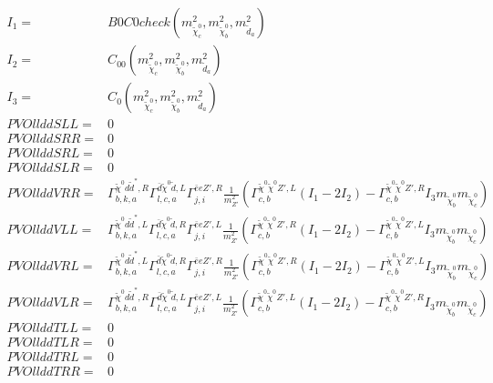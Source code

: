 \documentclass[A4,landscape]{article}
\begin{document}
\begin{align} 
I_1= & B0C0check(m^2_{\tilde{\chi}^0_{{c}}}, m^2_{\tilde{\chi}^0_{{b}}}, m^2_{\tilde{d}_{{a}}}) \\ 
I_2= & C_{00}(m^2_{\tilde{\chi}^0_{{c}}}, m^2_{\tilde{\chi}^0_{{b}}}, m^2_{\tilde{d}_{{a}}}) \\ 
I_3= & C_0(m^2_{\tilde{\chi}^0_{{c}}}, m^2_{\tilde{\chi}^0_{{b}}}, m^2_{\tilde{d}_{{a}}}) \\ 
  PVOllddSLL= & 0 \\ 
  PVOllddSRR= & 0 \\ 
  PVOllddSRL= & 0 \\ 
  PVOllddSLR= & 0 \\ 
  PVOllddVRR= &  \Gamma^{\tilde{\chi}^0 d \tilde{d}^*,R}_{b, k, a} \Gamma^{\bar{d}\tilde{\chi}^0 \tilde{d} ,L}_{l, c, a} \Gamma^{\bar{e}e {Z'} ,R}_{j, i} \frac{1}{m^2_{{Z'}}} (\Gamma^{\tilde{\chi}^0 \tilde{\chi}^0 {Z'} ,L}_{c, b} (I_1 - 2 I_2) - \Gamma^{\tilde{\chi}^0 \tilde{\chi}^0 {Z'} ,R}_{c, b} I_3 m_{\tilde{\chi}^0_{{b}}} m_{\tilde{\chi}^0_{{c}}}) \\ 
  PVOllddVLL= &  \Gamma^{\tilde{\chi}^0 d \tilde{d}^*,L}_{b, k, a} \Gamma^{\bar{d}\tilde{\chi}^0 \tilde{d} ,R}_{l, c, a} \Gamma^{\bar{e}e {Z'} ,L}_{j, i} \frac{1}{m^2_{{Z'}}} (\Gamma^{\tilde{\chi}^0 \tilde{\chi}^0 {Z'} ,R}_{c, b} (I_1 - 2 I_2) - \Gamma^{\tilde{\chi}^0 \tilde{\chi}^0 {Z'} ,L}_{c, b} I_3 m_{\tilde{\chi}^0_{{b}}} m_{\tilde{\chi}^0_{{c}}}) \\ 
  PVOllddVRL= &  \Gamma^{\tilde{\chi}^0 d \tilde{d}^*,L}_{b, k, a} \Gamma^{\bar{d}\tilde{\chi}^0 \tilde{d} ,R}_{l, c, a} \Gamma^{\bar{e}e {Z'} ,R}_{j, i} \frac{1}{m^2_{{Z'}}} (\Gamma^{\tilde{\chi}^0 \tilde{\chi}^0 {Z'} ,R}_{c, b} (I_1 - 2 I_2) - \Gamma^{\tilde{\chi}^0 \tilde{\chi}^0 {Z'} ,L}_{c, b} I_3 m_{\tilde{\chi}^0_{{b}}} m_{\tilde{\chi}^0_{{c}}}) \\ 
  PVOllddVLR= &  \Gamma^{\tilde{\chi}^0 d \tilde{d}^*,R}_{b, k, a} \Gamma^{\bar{d}\tilde{\chi}^0 \tilde{d} ,L}_{l, c, a} \Gamma^{\bar{e}e {Z'} ,L}_{j, i} \frac{1}{m^2_{{Z'}}} (\Gamma^{\tilde{\chi}^0 \tilde{\chi}^0 {Z'} ,L}_{c, b} (I_1 - 2 I_2) - \Gamma^{\tilde{\chi}^0 \tilde{\chi}^0 {Z'} ,R}_{c, b} I_3 m_{\tilde{\chi}^0_{{b}}} m_{\tilde{\chi}^0_{{c}}}) \\ 
  PVOllddTLL= & 0 \\ 
  PVOllddTLR= & 0 \\ 
  PVOllddTRL= & 0 \\ 
  PVOllddTRR= & 0 \\ 
\end{align} 
\end{document}
